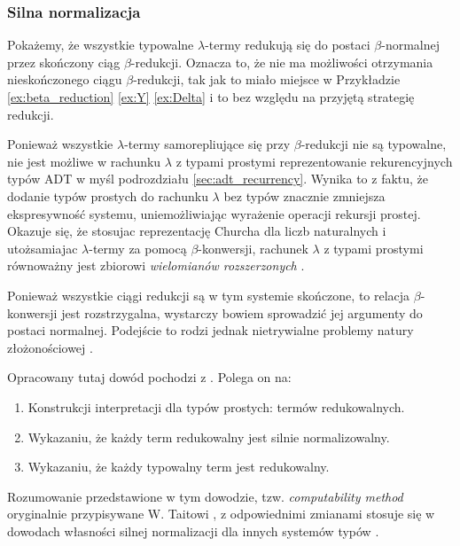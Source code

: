 \subsubsection{Silna normalizacja}
Pokażemy, że wszystkie typowalne \(\lambda\)-termy redukują się do postaci \(\beta\)-normalnej przez skończony ciąg \(\beta\)-redukcji. Oznacza to, że nie ma możliwości otrzymania nieskończonego ciągu \(\beta\)-redukcji, tak jak to miało miejsce w Przykładzie \ref{ex:beta_reduction} \ref{ex:Y} \ref{ex:Delta} i to bez względu na przyjętą strategię redukcji. 

Ponieważ wszystkie \(\lambda\)-termy samorepliujące się przy \(\beta\)-redukcji nie są typowalne, nie jest możliwe  w rachunku \(\lambda\) z typami prostymi reprezentowanie rekurencyjnych typów ADT w myśl podrozdziału \ref{sec:adt_recurrency}. Wynika to z faktu, że dodanie typów prostych do rachunku \(\lambda\) bez typów znacznie zmniejsza ekspresywność systemu, uniemożliwiając wyrażenie operacji rekursji prostej. Okazuje się, że stosujac reprezentację Churcha dla liczb naturalnych i utożsamiajac \(\lambda\)-termy za pomocą \(\beta\)-konwersji, rachunek \(\lambda\) z typami prostymi równoważny jest zbiorowi \emph{wielomianów rozszerzonych} \cite{DBLP:journals/corr/abs-cs-0701022}.

Ponieważ wszystkie ciągi redukcji są w tym systemie skończone, to relacja \(\beta\)-konwersji jest rozstrzygalna, wystarczy bowiem sprowadzić jej argumenty do postaci normalnej. Podejście to rodzi jednak nietrywialne problemy natury złożonościowej \cite[Podrozdział 3.7]{Urzyczyn2006}.
 
Opracowany tutaj dowód pochodzi z \cite{Hindley:2008:LCI:1388400}. Polega on na:
\begin{enumerate}
  \setlength\itemsep{0em}
  \item Konstrukcji interpretacji dla typów prostych: termów redukowalnych.
  \item Wykazaniu, że każdy term redukowalny jest silnie normalizowalny.
  \item Wykazaniu, że każdy typowalny term jest redukowalny.
\end{enumerate}
Rozumowanie przedstawione w tym dowodzie, tzw. \emph{computability method} oryginalnie przypisywane W. Taitowi \cite{Tait67}, z odpowiednimi zmianami stosuje się w dowodach własności silnej normalizacji dla innych systemów typów \cite[Podrozdział 11.5]{Urzyczyn2006}.

